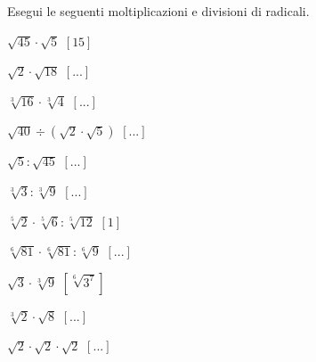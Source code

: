 \begin{esercizio}[*]
\label{ese:2.32}
Esegui le seguenti moltiplicazioni e divisioni di radicali.
\begin{htmulticols}{3}
\begin{enumeratea}
\item \(\sqrt{45}\cdot \sqrt 5\)
\hfill \(\left[15\right]\)
\item \(\sqrt 2\cdot \sqrt{18}\)
\hfill \(\left[...\right]\)
\item \(\sqrt[3]{16}\cdot \sqrt[3]4\)
\hfill \(\left[...\right]\)
\item \(\sqrt{40}\div(\sqrt{2}\cdot \sqrt{5})\)
\hfill \(\left[...\right]\)
\item \(\sqrt{5} : \sqrt{45}\)
\hfill \(\left[...\right]\)
\item \(\sqrt[3]3:\sqrt[3]9\)
\hfill \(\left[...\right]\)
\item \(\sqrt[5]2\cdot \sqrt[5]6:\sqrt[5]{12}\)
\hfill \(\left[1\right]\)
\item \(\sqrt[6]{81}\cdot \sqrt[6]{81}:\sqrt[6]9\)
\hfill \(\left[...\right]\)
\item \(\sqrt 3\cdot \sqrt[3]9\)
\hfill \(\left[\sqrt[6]{3^7}\right]\)
\item \(\sqrt[3]2\cdot \sqrt 8\)
\hfill \(\left[...\right]\)
\item \(\sqrt 2\cdot \sqrt 2\cdot\sqrt 2\)
\hfill \(\left[...\right]\)
\end{enumeratea}
\end{htmulticols}
\end{esercizio}

